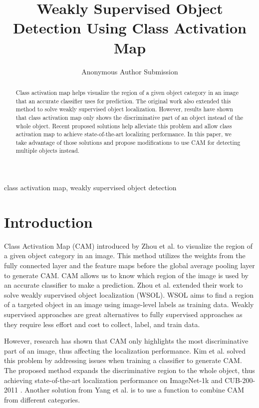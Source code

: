 \documentclass[conference]{IEEEtran}
\begin{document}
\title{Weakly Supervised Object Detection Using Class Activation Map\\
}

\author{Anonymous Author Submission}

\maketitle

\begin{abstract}
    Class activation map helps visualize the region of a given object category in an image that an accurate classifier uses for prediction. The original work also extended this method to solve weakly supervised object localization. However, results have shown that class activation map only shows the discriminative part of an object instead of the whole object. Recent proposed solutions help alleviate this problem and allow class activation map to achieve state-of-the-art localizing performance. In this paper, we take advantage of those solutions and propose modifications to use CAM for detecting multiple objects instead.
\end{abstract}

\begin{IEEEkeywords}
    class activation map, weakly supervised object detection
\end{IEEEkeywords}

\section{Introduction}
Class Activation Map (CAM) introduced by Zhou et al. \cite{zhou2015cnnlocalization} to visualize the region of a given object category in an image. This method utilizes the weights from the fully connected layer and the feature maps before the global average pooling layer to generate CAM. CAM allows us to know which region of the image is used by an accurate classifier to make a prediction. Zhou et al. extended their work to solve weakly supervised object localization (WSOL). WSOL aims to find a region of a targeted object in an image using image-level labels as training data. Weakly supervised approaches are great alternatives to fully supervised approaches \cite{Jocher_YOLO_by_Ultralytics_2023} \cite{ren2015faster} as they require less effort and cost to collect, label, and train data.

However, research has shown that CAM only highlights the most discriminative part of an image, thus affecting the localization performance. Kim et al. \cite{kim2022bridging} solved this problem by addressing issues when training a classifier to generate CAM. The proposed method expands the discriminative region to the whole object, thus achieving state-of-the-art localization performance on ImageNet-1k \cite{ILSVRC15} and CUB-200-2011 \cite{WahCUB_200_2011}. Another solution from Yang et al. \cite{yang2019combinational} is to use a function to combine CAM from different categories.
\end{document}
